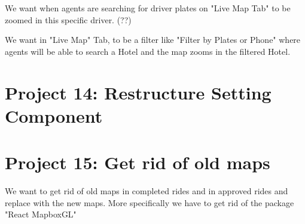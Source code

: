 We want when agents are searching for driver plates on "Live Map Tab" to be zoomed in this specific driver. (??)

We want in "Live Map" Tab, to be a filter like "Filter by Plates or Phone" where agents will be able to search a Hotel and the map zooms in the filtered Hotel.



\section{Project 14: Restructure Setting Component}

\section{Project 15: Get rid of old maps}

We want to get rid of old maps in completed rides and in approved rides and replace with the new maps. More specifically we have to get rid of the package "React MapboxGL"

